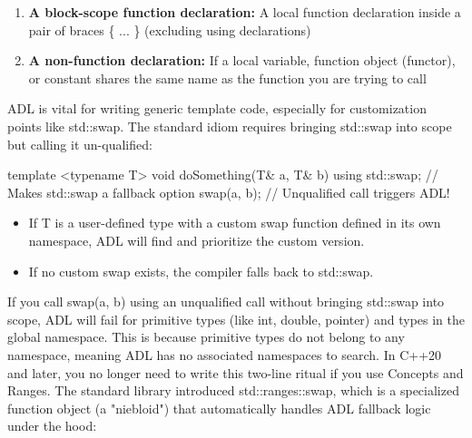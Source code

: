 \documentclass{report}
\begin{document}
\begin{itemize}
\begin{enumerate}
                \item \textbf{A block-scope function declaration:} A local function declaration inside a pair of braces \{ ... \} (excluding using declarations)
                \item \textbf{A non-function declaration:} If a local variable, function object (functor), or constant shares the same name as the function you are trying to call
            \end{enumerate}
            ADL is vital for writing generic template code, especially for customization points like std::swap. The standard idiom requires bringing std::swap into scope but calling it un-qualified:
            \bigbreak \noindent 
            \begin{cppcode}
                template <typename T>
                void doSomething(T& a, T& b) {
                    using std::swap; // Makes std::swap a fallback option
                    swap(a, b);      // Unqualified call triggers ADL!
                }
            \end{cppcode}
            \begin{itemize}
                \item If T is a user-defined type with a custom swap function defined in its own namespace, ADL will find and prioritize the custom version.
                \item If no custom swap exists, the compiler falls back to std::swap.
            \end{itemize}
            If you call swap(a, b) using an unqualified call without bringing std::swap into scope, ADL will fail for primitive types (like int, double, pointer) and types in the global namespace. This is because primitive types do not belong to any namespace, meaning ADL has no associated namespaces to search.
            \bigbreak \noindent 
            In C++20 and later, you no longer need to write this two-line ritual if you use Concepts and Ranges. The standard library introduced std::ranges::swap, which is a specialized function object (a "niebloid") that automatically handles ADL fallback logic under the hood:






    \end{itemize}


    \pagebreak 
\end{document}
